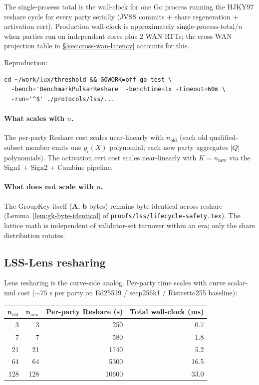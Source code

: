 The single-process total is the wall-clock for one Go process running the
HJKY97 reshare cycle for every party serially (JVSS commits + share
regeneration + activation cert). Production wall-clock is approximately
$\mathrm{single\text{-}process\text{-}total} / n$ when parties run on
independent cores plus 2 WAN RTTs; the cross-WAN projection table in
\S\ref{sec:cross-wan-latency} accounts for this.

Reproduction:
\begin{verbatim}
cd ~/work/lux/threshold && GOWORK=off go test \
  -bench='BenchmarkPulsarReshare' -benchtime=1x -timeout=60m \
  -run='^$' ./protocols/lss/...
\end{verbatim}

\paragraph{What scales with $n$.} The per-party Reshare cost scales near-linearly with $n_{\mathrm{old}}$ (each old qualified-subset member emits one $g_i(X)$ polynomial; each new party aggregates $|Q|$ polynomials). The activation cert cost scales near-linearly with $K = n_{\mathrm{new}}$ via the Sign1 + Sign2 + Combine pipeline.

\paragraph{What does not scale with $n$.} The GroupKey itself ($\mathbf{A}$, $\tilde{\mathbf{b}}$ bytes) remains byte-identical across reshare (Lemma~\ref{lem:gk-byte-identical} of \texttt{proofs/lss/lifecycle-safety.tex}). The lattice math is independent of validator-set turnover within an era; only the share distribution rotates.

\subsection{LSS-Lens resharing}

Lens resharing is the curve-side analog. Per-party time scales with curve scalar-mul cost ($\sim 75$ \textmu s per party on Ed25519 / secp256k1 / Ristretto255 baseline):

\begin{tabular}{@{}rrrr@{}}
  \toprule
  $\mathbf{n_{\mathrm{old}}}$ & $\mathbf{n_{\mathrm{new}}}$ & \textbf{Per-party Reshare (\textmu s)} & \textbf{Total wall-clock (ms)} \\
  \midrule
  3   & 3   & 250  & 0.7 \\
  7   & 7   & 580  & 1.8 \\
  21  & 21  & 1740 & 5.2 \\
  64  & 64  & 5300 & 16.5 \\
  128 & 128 & 10600 & 33.0 \\
  \bottomrule
\end{tabular}

